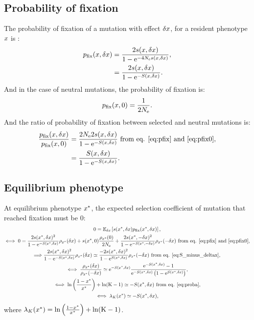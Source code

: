 \documentclass{article}
\begin{document}
\subsection{Probability of fixation}
The probability of fixation of a mutation with effect $\delta x$, for a resident phenotype $x$ is :
\begin{align}
p_{\text{fix}}(x, \delta x) &= \frac{ 2 s(x, \delta x)}{1 - \mathrm{e}^{-4N_{\mathrm{e}} s(x, \delta x)}}, \\
 &= \frac{ 2 s(x, \delta x)}{1 - \mathrm{e}^{-S(x, \delta x)}}. \label{eq:pfix}
\end{align}
And in the case of neutral mutations, the probability of fixation is:
\begin{gather}
p_{\text{fix}}(x, 0) = \frac{ 1}{2 N_{\mathrm{e}}} \label{eq:pfix0}.
\end{gather}
And the ratio of probability of fixation between selected and neutral mutations is:
\begin{align}
\frac{p_{\text{fix}}(x, \delta x)}{p_{\text{fix}}(x, 0)} & = \frac{ 2 N_{\mathrm{e}} 2 s(x, \delta x)}{1 - \mathrm{e}^{-S(x, \delta x)}} \text{ from eq. \ref{eq:pfix} and \ref{eq:pfix0}},\\
& = \frac{S(x, \delta x)}{1 - \mathrm{e}^{-S(x, \delta x)}} \label{eq:pfixratio}.
\end{align}
\subsection{Equilibrium phenotype}
At equilibrium phenotype $x^{*}$, the expected selection coefficient of mutation that reached fixation must be $0$:
\begin{gather}
 0 = \operatorname{\mathbb{E}}_{\delta x} \left[ s(x^{*}, \delta x) p_{\text{fix}}(x^{*}, \delta x) \right], \\
\iff 0 = \frac{ 2 s(x^{*}, \delta x)^2}{1 - \mathrm{e}^{-S(x^{*}, \delta x)}}   \rho_{x^{*}}(\delta x) + s(x^{*}, 0) \frac{ \rho_{x^{*}}(0)}{2N_{\mathrm{e}}} + \frac{ 2s(x^{*}, -\delta x)^2}{1 - \mathrm{e}^{-S(x^{*}, -\delta x)}} \rho_{x^{*}}(-\delta x)\text{ from eq. \ref{eq:pfix} and \ref{eq:pfix0}}, \\
\Longrightarrow \frac{ 2s(x^{*}, \delta x)^2}{1 - \mathrm{e}^{-S(x^{*}, \delta x)}}   \rho_{x^{*}}(\delta x) \simeq \frac{ - 2s(x^{*}, \delta x)^2}{1 - \mathrm{e}^{S(x^{*}, \delta x)}}   \rho_{x^{*}}(-\delta x) \text{ from eq. \ref{eq:S_minus_deltax}}, \\
\iff \frac{ \rho_{x^{*}}(\delta x)}{\rho_{x^{*}}(-\delta x)} \simeq \mathrm{e}^{-S(x^{*}, \delta x)} \frac{ \mathrm{e}^{-S(x^{*}, \delta x)} - 1}{ \mathrm{e}^{-S(x^{*}, \delta x)} \left( 1 - \mathrm{e}^{S(x^{*}, \delta x)} \right)}, \\
\iff \ln \left( \frac{1 - x^{*}}{x^{*}} \right) + \ln (\text{K}-1) \simeq -S(x^{*}, \delta x) \text{ from eq. \ref{eq:proba}} \label{eq:equilibrium}, \\
\iff \lambda_{K}(x^{*}) \simeq -S(x^{*}, \delta x) \label{eq:equilibrium_lambda},
\end{gather}
where  $\lambda_{K}(x^{*}) = \ln \left( \frac{1 - x^{*}}{x^{*}} \right) + \ln (\text{K}-1)$.
\end{document}
